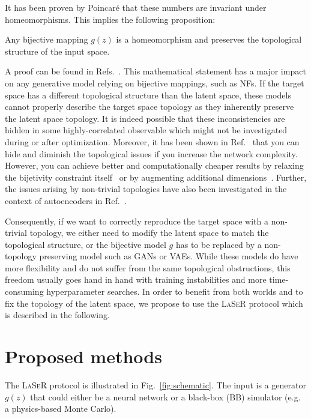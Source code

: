 It has been proven by Poincar\'{e} that these numbers are invariant under homeomorphisms. This implies the following proposition:
\begin{proposition}
Any bijective mapping $g(z)$ is a homeomorphism and preserves the topological structure of the input space.
\label{prop:topology}
\end{proposition}
A proof can be found in Refs.~\cite{younes2010shapes,dupont2019augmented}.
This mathematical statement has a major impact on any generative model relying on bijective mappings, such as NFs. If the target space has a different topological structure than the latent space, these models cannot properly describe the target space topology as they inherently preserve the latent space topology.  It is indeed possible that these inconsistencies are hidden in some highly-correlated observable which might not be investigated during or after optimization. Moreover, it has been shown in Ref.~\cite{cornish2021relaxing} that you can hide and diminish the topological issues if you increase the network complexity. However, you can achieve better and computationally cheaper results by relaxing the bijetivity constraint itself~\cite{cornish2021relaxing} or by augmenting additional dimensions~\cite{dupont2019augmented, huang2020augmented}. Further, the issues arising by non-trivial topologies have also been investigated in the context of autoencoders in Ref.~\cite{Batson:2021agz}.

Consequently, if we want to correctly reproduce the target space with a non-trivial topology, we either need to modify the latent space to match the topological structure, or the bijective model $g$ has to be replaced by a non-topology preserving model such as GANs or VAEs. While these models do have more flexibility and do not suffer from the same topological obstructions, this freedom usually goes hand in hand with training instabilities and more time-consuming hyperparameter searches. In order to benefit from both worlds and to fix the topology of the latent space, we propose to use the \textsc{LaSeR} protocol which is described in the following.

\section{Proposed methods}
\label{sec:methods}

The \textsc{LaSeR} protocol is illustrated in Fig.~\ref{fig:schematic}. The input is a generator $g(z)$ that could either be a neural network or a black-box (BB) simulator (e.g. a physics-based Monte Carlo).

